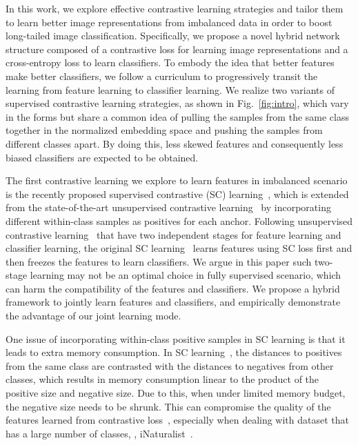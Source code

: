 \documentclass[final]{cvpr}
\begin{document}
In this work, we explore effective contrastive learning strategies and tailor them to learn better image representations from imbalanced data in order to boost long-tailed image classification. Specifically, we propose a novel hybrid network structure composed of a contrastive loss for learning image representations and a cross-entropy loss to learn classifiers. To embody the idea that better features make better classifiers, we follow a curriculum to progressively transit the learning from feature learning to classifier learning. We realize two variants of supervised contrastive learning strategies, as shown in Fig.~\ref{fig:intro}, which vary in the forms but share a common idea of pulling the samples from the same class together in the normalized embedding space and pushing the samples from different classes apart. By doing this, less skewed features and consequently less biased classifiers are expected to be obtained. 

The first contrastive learning we explore to learn features in imbalanced scenario is the recently proposed supervised contrastive (SC) learning~\cite{SC}, which is extended from the state-of-the-art unsupervised contrastive learning~\cite{simclr} by incorporating different within-class samples as positives for each anchor. Following unsupervised contrastive learning~\cite{simclr,moco} that have two independent stages for feature learning and classifier learning, the original SC learning~\cite{SC} learns features using SC loss first and then freezes the features to learn classifiers. We argue in this paper such two-stage learning may not be an optimal choice in fully supervised scenario, which can harm the compatibility of the features and classifiers. We propose a hybrid framework to jointly learn features and classifiers, and empirically demonstrate the advantage of our joint learning mode. 

One issue of incorporating within-class positive samples in SC learning is that it leads to extra memory consumption. In SC learning~\cite{SC}, the distances to positives from the same class are contrasted with the distances to negatives from other classes, which results in memory consumption linear to the product of the positive size and negative size. 
Due to this, when under limited memory budget, the negative size needs to be shrunk. This can compromise the quality of the features learned from contrastive loss~\cite{simclr},
especially when dealing with dataset that has a large number of classes, \eg, iNaturalist~\cite{inat2017}. 
\end{document}
